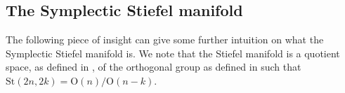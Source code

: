 \subsection{The Symplectic Stiefel manifold}


The following piece of insight can give some further intuition on what the Symplectic Stiefel manifold is. We note that the Stiefel manifold is a quotient space, as defined in , of the orthogonal group as defined in  such that $\mathrm{St}(2n, 2k)=\mathrm{O}(n)/\mathrm{O}(n-k)$. 